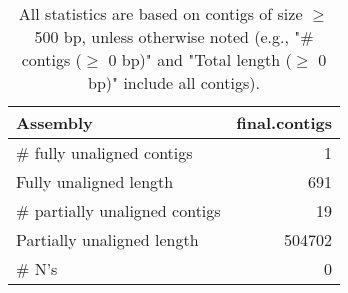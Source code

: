 \documentclass[12pt,a4paper]{article}
\begin{document}
\begin{table}[ht]
\begin{center}
\caption{All statistics are based on contigs of size $\geq$ 500 bp, unless otherwise noted (e.g., "\# contigs ($\geq$ 0 bp)" and "Total length ($\geq$ 0 bp)" include all contigs).}
\begin{tabular}{|l*{1}{|r}|}
\hline
Assembly & final.contigs \\ \hline
\# fully unaligned contigs & 1 \\ \hline
Fully unaligned length & 691 \\ \hline
\# partially unaligned contigs & 19 \\ \hline
Partially unaligned length & 504702 \\ \hline
\# N's & 0 \\ \hline
\end{tabular}
\end{center}
\end{table}
\end{document}
